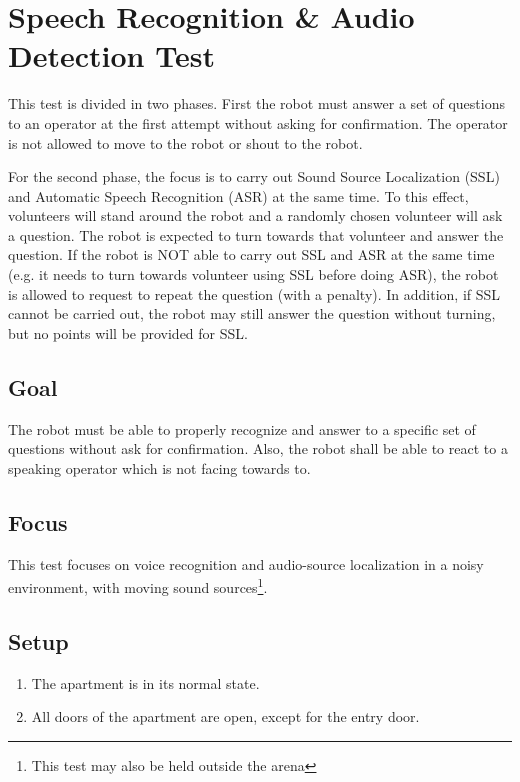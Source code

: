 \section{Speech Recognition \& Audio Detection Test}

This test is divided in two phases. First the robot must answer a set of questions to an operator at the first attempt without asking for confirmation. The operator is not allowed to move to the robot or shout to the robot.

For the second phase, the focus is to carry out Sound Source Localization (SSL) and Automatic Speech Recognition (ASR) at the same time. To this effect, volunteers will stand around the robot and a randomly chosen volunteer will ask a question. The robot is expected to turn towards that volunteer and answer the question. If the robot is NOT able to carry out SSL and ASR at the same time (e.g. it needs to turn towards volunteer using SSL before doing ASR), the robot is allowed to request to repeat the question (with a penalty). In addition, if SSL cannot be carried out, the robot may still answer the question without turning, but no points will be provided for SSL.

\subsection{Goal}
The robot must be able to properly recognize and answer to a specific set of questions without ask for confirmation. Also, the robot shall be able to react to a speaking operator which is not facing towards to.

\subsection{Focus}

This test focuses on voice recognition and audio-source localization in a noisy environment, with moving sound sources\footnote{This test may also be held outside the arena}.

\subsection{Setup}
\begin{enumerate}
\item The apartment is in its normal state.
\item All doors of the apartment are open, except for the entry door. 
\end{enumerate}

